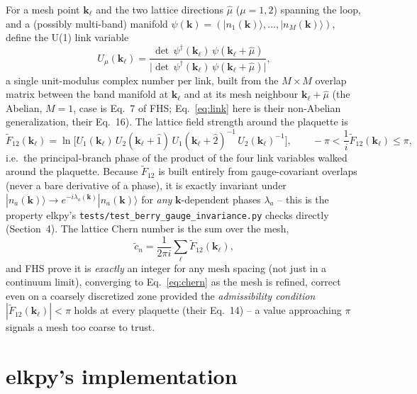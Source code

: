 \documentclass[11pt]{article}
\begin{document}
For a mesh point $\mathbf k_\ell$ and the two lattice directions $\hat\mu$ ($\mu=1,2$)
spanning the loop, and a (possibly multi-band) manifold $\psi(\mathbf k) =
(|n_1(\mathbf k)\rangle,\dots,|n_M(\mathbf k)\rangle)$, define the U(1) link variable
\begin{equation}
  U_\mu(\mathbf k_\ell) = \frac{\det\, \psi^\dagger(\mathbf k_\ell)\,
    \psi(\mathbf k_\ell+\hat\mu)}{\bigl|\det\, \psi^\dagger(\mathbf k_\ell)\,
    \psi(\mathbf k_\ell+\hat\mu)\bigr|},
  \label{eq:link}
\end{equation}
a single unit-modulus complex number per link, built from the $M \times M$ overlap
matrix between the band manifold at $\mathbf k_\ell$ and at its mesh neighbour
$\mathbf k_\ell+\hat\mu$ (the Abelian, $M=1$, case is Eq.~7 of FHS; Eq.~\eqref{eq:link}
here is their non-Abelian generalization, their Eq.~16). The lattice field strength
around the plaquette is
\begin{equation}
  \tilde F_{12}(\mathbf k_\ell) = \ln\!\bigl[
    U_1(\mathbf k_\ell)\, U_2(\mathbf k_\ell+\hat 1)\,
    U_1(\mathbf k_\ell+\hat 2)^{-1}\, U_2(\mathbf k_\ell)^{-1} \bigr],
  \qquad -\pi < \frac{1}{i}\tilde F_{12}(\mathbf k_\ell) \le \pi,
  \label{eq:fieldstrength}
\end{equation}
i.e.\ the principal-branch phase of the product of the four link variables walked
around the plaquette. Because $\tilde F_{12}$ is built entirely from gauge-covariant
overlaps (never a bare derivative of a phase), it is exactly invariant under
$|n_a(\mathbf k)\rangle \to e^{-i\lambda_a(\mathbf k)}|n_a(\mathbf k)\rangle$ for {\it
any} $\mathbf k$-dependent phases $\lambda_a$ -- this is the property elkpy's
\texttt{tests/test\_berry\_gauge\_invariance.py} checks directly (Section~4). The
lattice Chern number is the sum over the mesh,
\begin{equation}
  \tilde c_n = \frac{1}{2\pi i} \sum_\ell \tilde F_{12}(\mathbf k_\ell),
  \label{eq:latticechern}
\end{equation}
and FHS prove it is \emph{exactly} an integer for any mesh spacing (not just in a
continuum limit), converging to Eq.~\eqref{eq:chern} as the mesh is refined, correct
even on a coarsely discretized zone provided the \emph{admissibility condition}
$|\tilde F_{12}(\mathbf k_\ell)| < \pi$ holds at every plaquette (their Eq.~14) -- a
value approaching $\pi$ signals a mesh too coarse to trust.

\section{elkpy's implementation}
\end{document}
